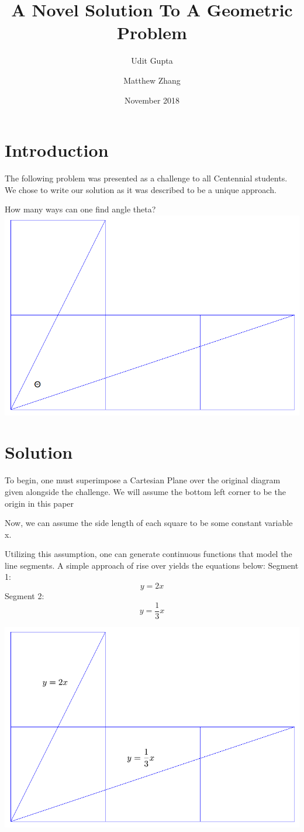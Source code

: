 \documentclass{article}
\title{A Novel Solution To A Geometric Problem}
\author{Udit Gupta \and Matthew Zhang}
\date{November 2018}
\begin{document}
\maketitle


\section*{Introduction}
The following problem was presented as a challenge to all Centennial students. We chose to write our solution as it was described to be a unique approach.
\begin{center}
	How many ways can one find angle theta?
	\includegraphics[width=.8\linewidth]{originalTheta.png}
\end{center}

\section*{Solution}
To begin, one must superimpose a Cartesian Plane over the original diagram given alongside the challenge. We will assume the bottom left corner to be the origin in this paper

Now, we can assume the side length of each square to be some constant variable x.

\pagebreak

Utilizing this assumption, one can generate continuous functions that model the line segments. A simple approach of rise over yields the equations below:
 Segment 1: $$ y=2x$$
 Segment 2: $$  y=\frac{1}{3}x$$
\begin{center}
	\includegraphics[width=.8\linewidth]{equations.png}
\end{center}
\end{document}
